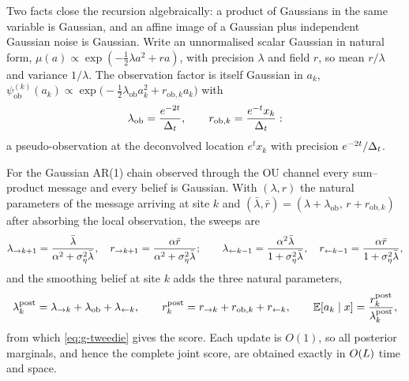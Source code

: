 Two facts close the recursion algebraically: a product of Gaussians in the
same variable is Gaussian, and an affine image of a Gaussian plus independent
Gaussian noise is Gaussian. Write an unnormalised scalar Gaussian in natural
form, $\mu(a) \propto \exp(-\tfrac12\lambda a^2 + r a)$, with precision
$\lambda$ and field $r$, so mean $r/\lambda$ and variance $1/\lambda$. The
observation factor is itself Gaussian in $a_k$,
$\psi^{(k)}_{\mathrm{ob}}(a_k) \propto \exp\big(-\tfrac12\lambda_{\mathrm{ob}} a_k^2
+ r_{\mathrm{ob},k} a_k\big)$ with
\begin{equation}
  \lambda_{\mathrm{ob}} = \frac{e^{-2t}}{\Delta_t},
  \qquad
  r_{\mathrm{ob},k} = \frac{e^{-t}x_k}{\Delta_t}:
  \label{eq:bp-observation-parameters}
\end{equation}
a pseudo-observation at the deconvolved location $e^{t}x_k$ with precision
$e^{-2t}/\Delta_t$.

\begin{theorem}\label{thm:bp-closure}
For the Gaussian AR(1) chain observed through the OU channel every
sum--product message and every belief is Gaussian. With $(\lambda, r)$ the
natural parameters of the message arriving at site $k$ and
$(\bar\lambda, \bar r) = (\lambda + \lambda_{\mathrm{ob}},\, r + r_{\mathrm{ob},k})$
after absorbing the local observation, the sweeps are
\begin{equation}
  \lambda_{\to k+1} = \frac{\bar\lambda}{\alpha^2 + \sigma_\eta^2\bar\lambda},
  \quad
  r_{\to k+1} = \frac{\alpha\bar r}{\alpha^2 + \sigma_\eta^2\bar\lambda};
  \qquad
  \lambda_{\leftarrow k-1} = \frac{\alpha^2\bar\lambda}{1 + \sigma_\eta^2\bar\lambda},
  \quad
  r_{\leftarrow k-1} = \frac{\alpha\bar r}{1 + \sigma_\eta^2\bar\lambda},
  \label{eq:bp-forward-precision}
\end{equation}
and the smoothing belief at site $k$ adds the three natural parameters,
\begin{equation}
  \lambda_k^{\mathrm{post}} = \lambda_{\to k} + \lambda_{\mathrm{ob}} + \lambda_{\leftarrow k},
  \qquad
  r_k^{\mathrm{post}} = r_{\to k} + r_{\mathrm{ob},k} + r_{\leftarrow k},
  \qquad
  \mathbb{E}[a_k \mid x] = \frac{r_k^{\mathrm{post}}}{\lambda_k^{\mathrm{post}}},
  \label{eq:bp-belief-mean}
\end{equation}
from which \eqref{eq:g-tweedie} gives the score. Each update is $O(1)$, so all
posterior marginals, and hence the complete joint score, are obtained exactly
in $O(L)$ time and space.
\end{theorem}

